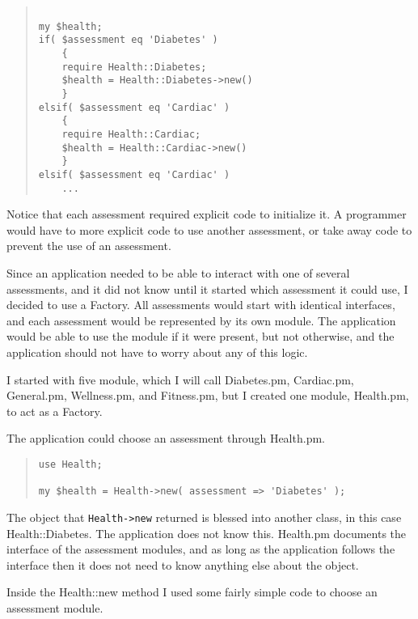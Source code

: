 \begin{quote}
\begin{verbatim}

my $health;
if( $assessment eq 'Diabetes' )
	{
	require Health::Diabetes;
	$health = Health::Diabetes->new()
	}
elsif( $assessment eq 'Cardiac' )
	{
	require Health::Cardiac;
	$health = Health::Cardiac->new()
	}
elsif( $assessment eq 'Cardiac' )
	...
\end{verbatim}
\end{quote}

Notice that each assessment required explicit code to initialize
it.  A programmer would have to more explicit code to use another
assessment, or take away code to prevent the use of an assessment.

Since an application needed to be able to interact with one of
several assessments, and it did not know until it started which
assessment it could use, I decided to use a Factory.  All assessments
would start with identical interfaces, and each assessment would be
represented by its own module.  The application would be able to use
the module if it were present, but not otherwise, and the application
should not have to worry about any of this logic.

I started with five module, which I will call Diabetes.pm, Cardiac.pm,
General.pm, Wellness.pm, and Fitness.pm, but I created one module, Health.pm, 
to act as a Factory.

The application could choose an assessment through Health.pm.

\begin{quote}
\begin{verbatim}
use Health;

my $health = Health->new( assessment => 'Diabetes' );
\end{verbatim}
\end{quote}

The object that {\tt Health->new} returned is blessed into another
class, in this case Health::Diabetes.  The application does not
know this.  Health.pm documents the interface of the assessment
modules, and as long as the application follows the interface then
it does not need to know anything else about the object.

Inside the Health::new method I used some fairly simple code to
choose an assessment module.

